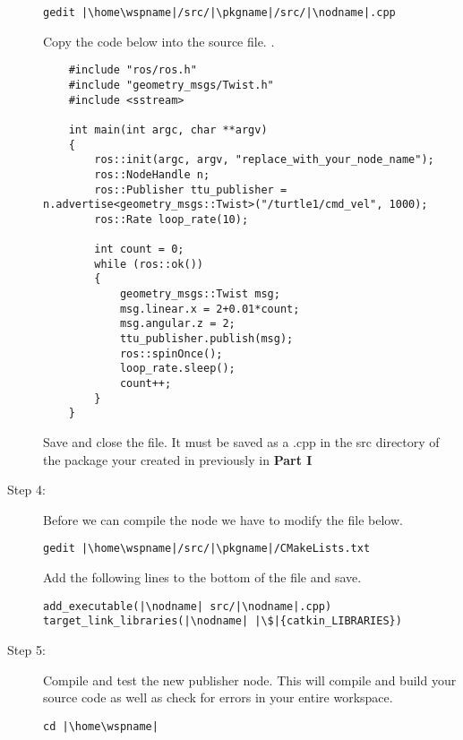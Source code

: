 \documentclass[12pt]{article}
\begin{document}
\begin{description}[labelindent=1cm]
\begin{description}
	\begin{verbatim}  
gedit |\home\wspname|/src/|\pkgname|/src/|\nodname|.cpp
	\end{verbatim}
	  
	 Copy the code below into the source file. . \vspace{1mm}
	
	 
	\begin{lstlisting}
	#include "ros/ros.h"
	#include "geometry_msgs/Twist.h"
	#include <sstream>
	
	int main(int argc, char **argv)
	{
	    ros::init(argc, argv, "replace_with_your_node_name");
	    ros::NodeHandle n;
	    ros::Publisher ttu_publisher = n.advertise<geometry_msgs::Twist>("/turtle1/cmd_vel", 1000);
	    ros::Rate loop_rate(10);
	
	    int count = 0;
	    while (ros::ok())
	    {
	        geometry_msgs::Twist msg;
	        msg.linear.x = 2+0.01*count;
	        msg.angular.z = 2;
	        ttu_publisher.publish(msg);
	        ros::spinOnce();
	        loop_rate.sleep();
	        count++;
	    }
	}
	\end{lstlisting}
	
	
	Save and close the file. It must be saved as a \nodname.cpp in the src directory of the package your created in previously in {\bf Part I}
	
	\item[Step 4:] Before we can compile the node we have to modify the file below.
	
	\begin{verbatim}  
gedit |\home\wspname|/src/|\pkgname|/CMakeLists.txt
	\end{verbatim}
	
	Add the following lines to the bottom of the file and save.
	
	\begin{verbatim}
add_executable(|\nodname| src/|\nodname|.cpp)
target_link_libraries(|\nodname| |\$|{catkin_LIBRARIES}) 
	\end{verbatim}
	\newpage
	 
	
	\item[Step 5:] Compile and test the new publisher node. This will compile and build your source code as well as check for errors in your entire workspace.
	\begin{verbatim}  
cd |\home\wspname|
	\end{verbatim}
	

\end{description}
\end{description}
\end{document}
